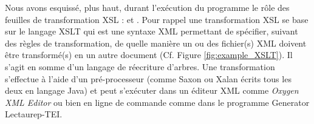 Nous avons esquissé, plus haut, durant l'exécution du programme le rôle des feuilles de transformation XSL :  et . Pour rappel une transformation XSL se base sur le langage XSLT qui est une syntaxe XML permettant de spécifier, suivant des règles de transformation, de quelle manière un ou des fichier(s) XML doivent être transformé(s) en un autre document (Cf. Figure \ref{fig:example_XSLT}). Il s'agit en somme d'un langage de réecriture d'arbres. Une transformation s'effectue à l'aide d'un pré-processeur (comme Saxon ou Xalan écrits tous les deux en langage Java) et peut s'exécuter dans un éditeur XML comme \textit{Oxygen XML Editor} ou bien en ligne de commande comme dans le programme Generator Lectaurep-TEI.\\

